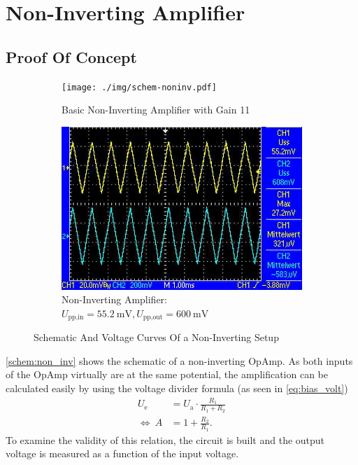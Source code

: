 \chapter{Non-Inverting Amplifier}
\section{Proof Of Concept}
\begin{figure}[tbp]
	\centering
	\begin{subfigure}{0.4\textwidth}
		\centering
		\texttt{[image: ./img/schem-noninv.pdf]}
		\caption{Basic Non-Inverting Amplifier with Gain 11}
		\label{schem:non_inv}
	\end{subfigure}
	\begin{subfigure}{0.4\textwidth}
		\centering
		\includegraphics[width=.9\linewidth]{./img/non-inv-curve.jpg}
		\caption{Non-Inverting Amplifier:\newline $U_\text{pp,in}=\SI{55.2}{\milli\volt}, U_\text{pp,out}=\SI{600}{\milli\volt}$}
		\label{subfig:non_inv_curve}
	\end{subfigure}
	\caption{Schematic And Voltage Curves Of a Non-Inverting Setup}
\end{figure}
\autoref{schem:non_inv} shows the schematic of a non-inverting OpAmp.
As both inputs of the OpAmp virtually are at the same potential, the amplification can be calculated easily by using the voltage divider formula (as seen in \autoref{eq:bias_volt})
\begin{align*}
	U_\text{e}&=U_\text{a}\cdot\frac{R_1}{R_1+R_2} \\
	\Leftrightarrow\ A &=1+\frac{R_2}{R_1}.
\end{align*}
To examine the validity of this relation, the circuit is built and the output voltage is measured as a function of the input voltage.

